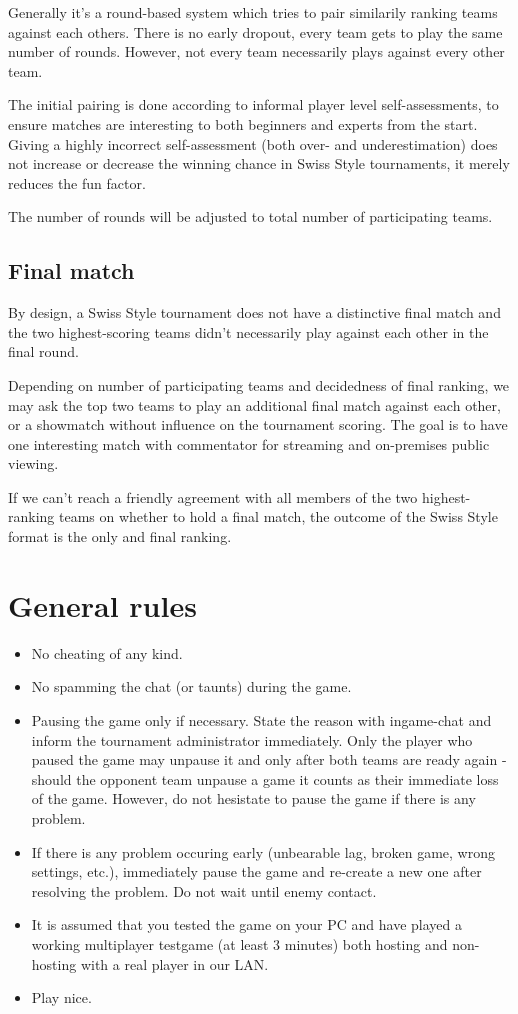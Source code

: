 \documentclass{article}
\begin{document}
Generally it's a round-based system which tries to pair similarily ranking teams against each others. There is no early dropout, every team gets to play the same number of rounds. However, not every team necessarily plays against every other team.

The initial pairing is done according to informal player level self-assessments, to ensure matches are interesting to both beginners and experts from the start. Giving a highly incorrect self-assessment (both over- and underestimation) does not increase or decrease the winning chance in Swiss Style tournaments, it merely reduces the fun factor.

The number of rounds will be adjusted to total number of participating teams.


\subsection{Final match}
By design, a Swiss Style tournament does not have a distinctive final match and the two highest-scoring teams didn't necessarily play against each other in the final round.

Depending on number of participating teams and decidedness of final ranking, we may ask the top two teams to play an additional final match against each other, or a showmatch without influence on the tournament scoring. The goal is to have one interesting match with commentator for streaming and on-premises public viewing.

If we can't reach a friendly agreement with all members of the two highest-ranking teams on whether to hold a final match, the outcome of the Swiss Style format is the only and final ranking.

\newpage
\section{General rules}
\begin{itemize}
\item No cheating of any kind.
\item No spamming the chat (or taunts) during the game.
\item Pausing the game only if necessary. State the reason with ingame-chat and inform the tournament administrator immediately. Only the player who paused the game may unpause it and only after both teams are ready again - should the opponent team unpause a game it counts as their immediate loss of the game. However, do not hesistate to pause the game if there is any problem.
\item If there is any problem occuring early (unbearable lag, broken game, wrong settings, etc.), immediately pause the game and re-create a new one after resolving the problem. Do not wait until enemy contact.
\item It is assumed that you tested the game on your PC and have played a working multiplayer testgame (at least 3 minutes) both hosting and non-hosting with a real player in our LAN.
\item Play nice.
\end{itemize}
\end{document}

